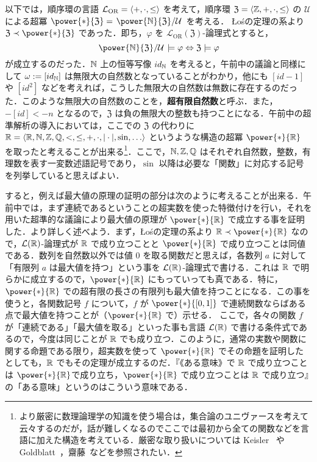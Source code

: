 \documentclass[a4j]{jsarticle}
\newcommand{\Los}{{\L}o\'{s}}
\begin{document}
以下では，順序環の言語 $\mathcal{L}_{\mathrm{OR}} = \braket{+, \cdot, \leq}$ を考えて，順序環 $\mathfrak{Z} = \braket{\mathbb{Z}, +, \cdot, \leq}$ の $\mathcal{U}$ による超冪 $\power{*}{\mathfrak{Z}} = \quot{\power{\N}{\mathfrak{Z}}}{\mathcal{U}}$ を考える．
\Los の定理の系より $\mathfrak{Z} \prec \power{*}{\mathfrak{Z}}$ であった．即ち，$\varphi$ を $\mathcal{L}_{\mathrm{OR}}(\mathfrak{Z})$-論理式とすると，
\[
 \quot{\power{\N}{\mathfrak{Z}}}{\mathcal{U}} \models \varphi
 \Leftrightarrow \mathfrak{Z} \models \varphi
\]
が成立するのだった．$\mathbb{N}$ 上の恒等写像 $id_{\mathbb{N}}$ を考えると，午前中の議論と同様にして $\omega \mathrel{:=} [id_{\mathbb{N}}]$ は無限大の自然数となっていることがわかり，他にも $[id - 1]$ や $[id^2]$ などを考えれば，こうした無限大の自然数は無数に存在するのだった．このような無限大の自然数のことを，{\bfseries 超有限自然数}と呼ぶ．また， $-[id] < -n$ となるので，$\mathfrak{Z}$ は負の無限大の整数も持つことになる．午前中の超準解析の導入においては，ここでの $\mathfrak{Z}$ の代わりに $\mathbb{R} = \braket{\mathbb{R}, \mathbb{N}, \mathbb{Z}, \mathbb{Q}, <, \leq, +, \cdot , |\cdot|, \sin, \dots}$ というような構造の超冪 $\power{*}{\R}$ を取ったと考えることが出来る\footnote{より厳密に数理論理学の知識を使う場合は，集合論のユニヴァースを考えて云々するのだが，話が難しくなるのでここでは最初から全ての関数などを言語に加えた構造を考えている．厳密な取り扱いについては Keisler~\cite{Keisler} や Goldblatt~\cite{Goldblatt}，齋藤~\cite{Saito}などを参照されたい．}．ここで，$\mathbb{N}, \mathbb{Z}, \mathbb{Q}$ はそれぞれ自然数，整数，有理数を表す一変数述語記号であり，$\sin$ 以降は必要な「関数」に対応する記号を列挙していると思えばよい．

すると，例えば最大値の原理の証明の部分は次のように考えることが出来る．午前中では，まず連続であるということの超実数を使った特徴付けを行い，それを用いた超準的な議論により最大値の原理が $\power{*}{\R}$ で成立する事を証明した．より詳しく述べよう．まず，\Los の定理の系より $\R \prec \power{*}{\R}$ なので，$\mathcal{L}(\mathbb{R})$-論理式が $\mathbb{R}$ で成り立つことと $\power{*}{\R}$ で成り立つことは同値である．数列を自然数以外では値 $0$ を取る関数だと思えば，各数列 $a$ に対して「有限列 $a$ は最大値を持つ」という事を $\mathcal{L}(\mathbb{R})$-論理式で書ける．これは $\mathbb{R}$ で明らかに成立するので，$\power{*}{\R}$ にもっていっても真である．特に，$\power{*}{\R}$ での超有限の長さの有限列も最大値を持つことになる．この事を使うと，各関数記号 $f$ について，$f$ が $\power{*}{[0,1]}$ で連続関数ならばある点で最大値を持つことが（$\power{*}{\R}$ で）示せる．
ここで，各々の関数 $f$ が「連続である」「最大値を取る」といった事も言語 $\mathcal{L}(\mathbb{R})$ で書ける条件式であるので，今度は同じことが $\mathbb{R}$ でも成り立つ．このように，通常の実数や関数に関する命題である限り，超実数を使って $\power{*}{\R}$ でその命題を証明したとしても，$\mathbb{R}$ でもその定理が成立するのだ．『《ある意味》で $\mathbb{R}$ で成り立つことは $\power{*}{\R}$で成り立ち，$\power{*}{\R}$ で成り立つことは $\mathbb{R}$ で成り立つ』の「ある意味」というのはこういう意味である．
\end{document}
